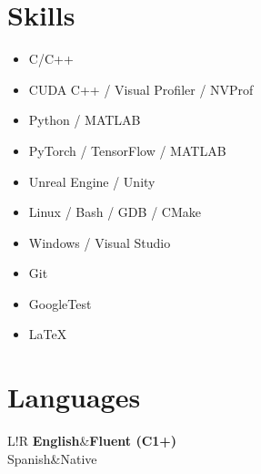 \documentclass[8pt]{article}
\newcommand\VRule{\color{lightgray}\vrule width 0.5pt}
\begin{document}
\section*{Skills}

\begin{itemize}
	\item C/C++
	\item CUDA C++ / Visual Profiler / NVProf
	\item Python / MATLAB
	\item PyTorch / TensorFlow / MATLAB
	\item Unreal Engine / Unity
	\item Linux / Bash / GDB / CMake
	\item Windows / Visual Studio
	\item Git
	\item GoogleTest
	\item \LaTeX
\end{itemize}

\section*{Languages}
\begin{tabular}{L!{\VRule}R}
{\bf English}&{\bf Fluent (C1+)}\\
{Spanish}&{Native}\\
\end{tabular}
\end{document}
